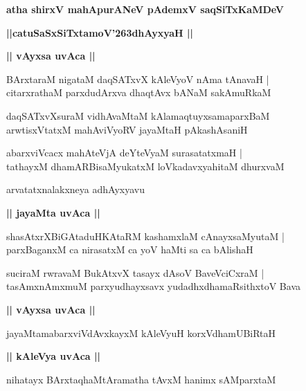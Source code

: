 \documentclass[twoside,12pt,openright]{book}
\def\S{\char'263}
\newcounter{shloka}[chapter]
\def\uvaca#1{\centerline{{\large\textbf{#1}}}}
\begin{document}
\begin{center}
{\LARGE\bfseries atha shirxV mahApurANeV pAdemxV saqSiTxKaMDeV}
\end{center}

\begin{center}
{\LARGE\bfseries ||catuSaSxSiTxtamoV\S dhAyxyaH || }
\end{center}

\uvaca{|| vAyxsa uvAca ||}

\begin{shloka}%
BArxtaraM nigataM daqSATxvX kAleVyoV nAma tAnavaH |\\
citarxrathaM parxdudArxva dhaqtAvx bANaM sakAmuRkaM 
\end{shloka}

\begin{shloka}%
daqSATxvXsuraM vidhAvaMtaM kAlamaqtuyxsamaparxBaM \\
arwtisxVtatxM mahAviVyoRV jayaMtaH pAkashAsaniH
\end{shloka}

\begin{shloka}%
abarxviVcacx mahAteVjA deYteVyaM surasatatxmaH |\\
tathayxM dhamARBisaMyukatxM loVkadavxyahitaM dhurxvaM
\end{shloka}

\begin{center}
arvatatxnalakxneya adhAyxyavu 
\end{center}

\uvaca{|| jayaMta uvAca ||}

\begin{shloka}%
shasAtxrXBiGAtaduHKAtaRM kashamxlaM cAnayxsaMyutaM |\\
parxBaganxM ca nirasatxM ca yoV haMti sa ca bAlishaH 
\end{shloka}

\begin{shloka}%
suciraM rwravaM BukAtxvX tasayx dAsoV BaveVciCxraM |\\
tasAmxnAmxmuM parxyudhayxsavx yudadhxdhamaRsithxtoV Bava
\end{shloka}

\uvaca{|| vAyxsa uvAca ||}

\begin{shloka}%
jayaMtamabarxviVdAvxkayxM kAleVyuH korxVdhamUBiRtaH 
\end{shloka}

\uvaca{|| kAleVya uvAca ||}

\begin{shloka}%
nihatayx BArxtaqhaMtAramatha tAvxM hanimx sAMparxtaM 
\end{shloka}
\end{document}
